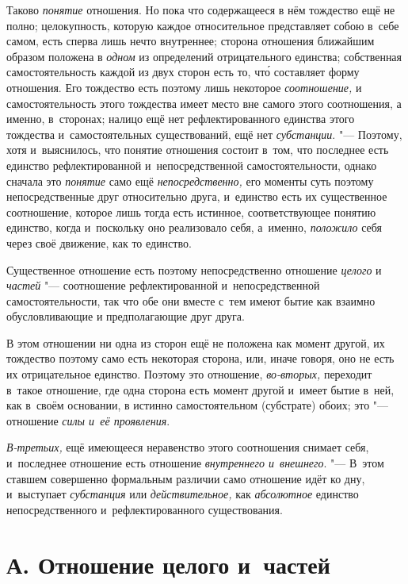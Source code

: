 Таково {\em понятие} отношения. Но пока что содержащееся
в нём тождество ещё не полно; целокупность, которую каждое относительное
представляет собою в~себе самом, есть сперва лишь нечто внутреннее; сторона
отношения ближайшим образом положена в {\em одном} из
определений отрицательного единства; собственная самостоятельность каждой
из двух сторон есть то, чт\'{о} составляет форму отношения. Его тождество есть
поэтому лишь некоторое {\em соотношение,} и
самостоятельность этого тождества имеет место вне самого этого соотношения,
а именно, в~сторонах; налицо ещё нет рефлектированного единства этого
тождества и~самостоятельных существований, ещё нет
{\em субстанции}. "--- Поэтому, хотя и~выяснилось, что
понятие отношения состоит в~том, что последнее есть единство
рефлектированной и~непосредственной самостоятельности, однако сначала это
{\em понятие} само ещё {\em непосредственно,} его моменты суть поэтому
непосредственные друг относительно друга, и~единство есть их существенное
соотношение, которое лишь тогда есть истинное, соответствующее понятию
единство, когда и~поскольку оно реализовало себя, а~именно,
{\em положило} себя через своё движение, как то единство.

Существенное отношение есть поэтому непосредственно отношение
{\em целого} и {\em частей}
"--- соотношение рефлектированной и~непосредственной самостоятельности, так
что обе они вместе с~тем имеют бытие как взаимно обусловливающие и
предполагающие друг друга.

В этом отношении ни одна из сторон ещё не положена как момент другой, их
тождество поэтому само есть некоторая сторона, или, иначе говоря, оно не
есть их отрицательное единство. Поэтому это отношение,
{\em во-вторых,} переходит в~такое отношение, где одна
сторона есть момент другой и~имеет бытие в~ней, как в~своём основании, в
истинно самостоятельном (субстрате) обоих; это "--- отношение
{\em силы и~её проявления}.

{\em В-третьих,} ещё имеющееся неравенство этого
соотношения снимает себя, и~последнее отношение есть отношение
{\em внутреннего и~внешнего}. "--- В~этом ставшем
совершенно формальным различии само отношение идёт ко дну, и~выступает
{\em субстанция} или {\em действительное,} как
{\em абсолютное} единство непосредственного и~рефлектированного существования.


\section[А. Отношение целого и~частей]{А. Отношение целого и~частей}

